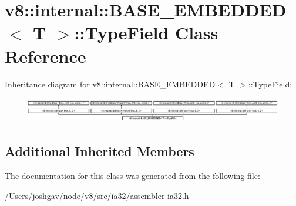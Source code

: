 \hypertarget{classv8_1_1internal_1_1_b_a_s_e___e_m_b_e_d_d_e_d_1_1_type_field}{}\section{v8\+:\+:internal\+:\+:B\+A\+S\+E\+\_\+\+E\+M\+B\+E\+D\+D\+ED$<$ T $>$\+:\+:Type\+Field Class Reference}
\label{classv8_1_1internal_1_1_b_a_s_e___e_m_b_e_d_d_e_d_1_1_type_field}
Inheritance diagram for v8\+:\+:internal\+:\+:B\+A\+S\+E\+\_\+\+E\+M\+B\+E\+D\+D\+ED$<$ T $>$\+:\+:Type\+Field\+:\begin{figure}[H]
\begin{center}
\leavevmode
\includegraphics[height=1.120000cm]{classv8_1_1internal_1_1_b_a_s_e___e_m_b_e_d_d_e_d_1_1_type_field}
\end{center}
\end{figure}
\subsection*{Additional Inherited Members}


The documentation for this class was generated from the following file\+:\begin{DoxyCompactItemize}
\item 
/\+Users/joshgav/node/v8/src/ia32/assembler-\/ia32.\+h\end{DoxyCompactItemize}
